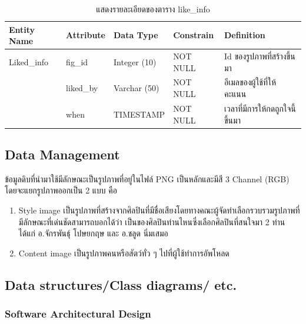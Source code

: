 \documentclass[12pt,oneside,openright,a4paper]{cpe-thai-project}
\begin{document}
\begin{table}[!h]
  \caption{แสดงรายละเอียดของตาราง like\_info}\label{tbl:like_info}
  \begin{tabular}{|l|l|l|l|l|}
  \hline
  \rowcolor[HTML]{DAE8FC} 
  Entity Name & Attribute & Data Type    & Constrain & Definition                      \\ \hline
  Liked\_info & fig\_id   & Integer (10) & NOT NULL  & Id ของรูปภาพที่สร้างขึ้นมา      \\ \hline
              & liked\_by & Varchar (50) & NOT NULL  & อีเมลของผู้ใช้ที่ให้คะแนน       \\ \hline
              & when      & TIMESTAMP    & NOT NULL  & เวลาที่มีการให้กดถูกใจนี้ขึ้นมา \\ \hline
  \end{tabular}
\end{table}

\newpage

\subsection{Data Management}
ข้อมูลดิบที่นำมาใช้มีลักษณะเป็นรูปภาพที่อยู่ในไฟล์ PNG เป็นหลักและมีสี 3 Channel (RGB) โดยจะแยกรูปภาพออกเป็น 2 แบบ คือ
\begin{enumerate}
  \item Style image เป็นรูปภาพที่สร้างจากศิลปินที่มีชื่อเสียงโดยทางคณะผู้จัดทำเลือกรวบรวมรูปภาพที่มีลักษณะที่เด่นชัดสามารถบอกได้ว่า เป็นของศิลปินท่านไหนซึ่งเลือกศิลปินที่สนใจมา 2 ท่าน ได้แก่ อ.จักรพันธุ์ โปษยกฤษ และ อ.ชลูด นิ่มเสมอ
  \item Content image เป็นรูปภาพคนหรือสัตว์ทั่ว ๆ ไปที่ผู้ใช้ทำการอัพโหลด
\end{enumerate}

\subsection{Data structures/Class diagrams/ etc.}
\subsubsection{Software Architectural Design}
\end{document}
